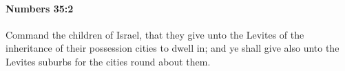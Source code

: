 
		\paragraph{Numbers 35:2} %
			\label{NUMBERS-35-2}

			Command the children of Israel, that they give unto the Levites of the inheritance of their possession cities to dwell in; and ye shall give also unto the Levites suburbs for the cities round about them.


